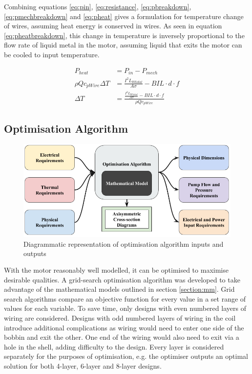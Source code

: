 \documentclass[a4paper,12pt]{article}
\begin{document}
Combining equations \ref{eq:pin}, \ref{eq:resistance}, \ref{eq:pbreakdown}, \ref{eq:pmechbreakdown} and \ref{eq:pheat} gives a formulation for temperature change of wires, assuming heat energy is conserved in wires. As seen in equation \ref{eq:pheatbreakdown}, this change in temperature is inversely proportional to the flow rate of liquid metal in the motor, assuming liquid that exits the motor can be cooled to input temperature.

\begin{equation}\label{eq:pheatbreakdown}
    \begin{split}
        P_{heat} & = P_{in}-P_{mech}\\
        \rho Q c_{pWire} \Delta T & = \frac{I^2L_{Wtotal}}{A\sigma}-BIL\cdot d \cdot f \\
        \Delta T & = \frac{\frac{I^2L_{Wtotal}}{A\sigma}-BIL\cdot d \cdot f}{\rho Q c_{pWire}}
    \end{split}
\end{equation}

\subsection{Optimisation Algorithm}

\begin{figure}[h!]
    \centering
    \includegraphics[scale=0.4]{optiAlgro.png}
    \caption{Diagrammatic representation of optimisation algorithm inputs and outputs}
    \label{fg:optiAlgo}
\end{figure}

With the motor reasonably well modelled, it can be optimised to maximise desirable qualities. A grid-search optimisation algorithm was developed to take advantage of the mathematical models outlined in section \ref{section:mm}. Grid search algorithms compare an objective function for every value in a set range of values for each variable. To save time, only designs with even numbered layers of wiring are considered. Designs with odd numbered layers of wiring in the coil introduce additional complications as wiring would need to enter one side of the bobbin and exit the other. One end of the wiring would also need to exit via a hole in the shell, adding difficulty to the design. Every layer is considered separately for the purposes of optimisation, e.g. the optimiser outputs an optimal solution for both 4-layer, 6-layer and 8-layer designs.
\end{document}

